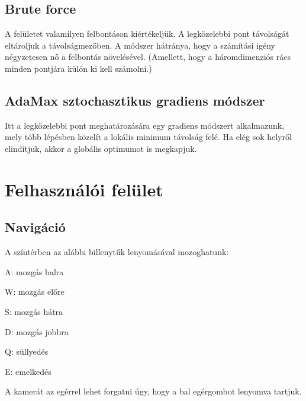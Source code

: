\subsection{Brute force}
A felületet valamilyen felbontáson kiértékeljük. A legközelebbi pont távolságát eltároljuk a távolságmezőben. A módszer hátránya, hogy a számítási igény négyzetesen nő a felbontás növelésével. (Amellett, hogy a háromdimenziós rács minden pontjára külön ki kell számolni.)

\subsection{AdaMax sztochasztikus gradiens módszer}
Itt a legközelebbi pont meghatározására egy gradiens módszert alkalmazunk, mely több lépésben közelít a lokális minimum távolság felé. Ha elég sok helyről elindítjuk, akkor a globális optimumot is megkapjuk.

\section{Felhasználói felület}

\subsection{Navigáció}
A színtérben az alábbi billenytűk lenyomásával mozoghatunk:
\begin{compactenum}
	\item A: mozgás balra
	\item W: mozgás előre
	\item S: mozgás hátra
	\item D: mozgás jobbra
	\item Q: süllyedés
	\item E: emelkedés
\end{compactenum}

A kamerát az egérrel lehet forgatni úgy, hogy a bal egérgombot lenyomva tartjuk. 

